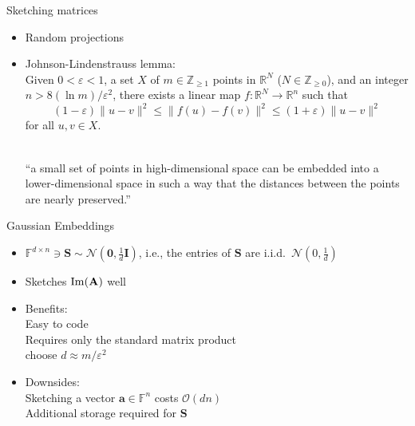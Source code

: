 \documentclass{beamer}
\newcommand{\bgk}[1]{\boldsymbol{#1}}
\newcommand{\bzero}{\bgk{0}}
\newcommand{\bvec}[1]{\mathbf{#1}}
\newcommand{\va}{\bvec{a}}
\newcommand{\vA}{\bvec{A}}
\newcommand{\vI}{\bvec{I}}
\newcommand{\vS}{\bvec{S}}
\newcommand{\bitem}{\item[$\bullet$]}
\begin{document}
\begin{frame}{Sketching matrices}

\begin{itemize}
    \bitem  Random projections\\
    \bitem Johnson-Lindenstrauss lemma:\\
    Given $0<\varepsilon <1$, a set $X$ of $m\in \mathbb {Z} _{\geq 1}$ points in $\mathbb {R} ^{N}$ ($N\in \mathbb {Z} _{\geq 0}$), and an integer $n>8(\ln m)/\varepsilon ^{2}$, there exists a linear map $f:\mathbb {R} ^{N}\rightarrow \mathbb {R} ^{n}$ such that
    $$
    (1-\varepsilon )\|u-v\|^{2}\leq \|f(u)-f(v)\|^{2}\leq (1+\varepsilon )\|u-v\|^{2}
    $$
    for all $ u,v\in X$.\\~\\
    \begin{center}
    ``a small set of points in high-dimensional space can be embedded into a lower-dimensional space in such a way that the distances between the points are nearly preserved.''
    \end{center}
\end{itemize}
    
\end{frame}


\begin{frame}{Gaussian Embeddings}

\begin{itemize}
    \bitem $\mathbb{F}^{d \times n} \ni \vS\sim \mathcal{N}(\bzero, \frac{1}{d}\vI)$, i.e., the entries of $\vS$ are i.i.d.~$\mathcal{N}(0,\frac{1}{d})$
    \bitem Sketches ${\rm Im}(\vA)$ well\\
    \bitem Benefits:\\
    Easy to code\\
    Requires only the standard matrix product\\
    choose $d \approx m/\varepsilon^2$
    \bitem Downsides:\\
    Sketching a vector $\va\in\mathbb{F}^{n}$ costs $\mathcal{O}(dn)$\\
    Additional storage required for $\vS$
\end{itemize}

\end{frame}
\end{document}
